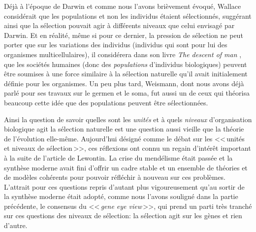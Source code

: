Déjà à l'époque de Darwin et comme nous l'avons brièvement évoqué, Wallace considérait que les populations et non les individus étaient sélectionnés, suggérant ainsi que la sélection pouvait agir à différents niveaux que celui envisagé par Darwin. Et en réalité, même si pour ce dernier, la pression de sélection ne peut porter que sur les variations des individus (individus qui sont pour lui des organismes multicellulaires), il considérera dans son livre \emph{The descent of man} \citep{darwin1871thedescentofman}, que les sociétés humaines (donc des \emph{populations} d'individus biologiques) peuvent être soumises à une force similaire à la sélection naturelle qu'il avait initialement définie pour les organismes. Un peu plus tard, Weismann, dont nous avons déjà parlé pour ses travaux sur le germen et le soma, fut aussi un de ceux qui théorisa beaucoup cette idée que des populations peuvent être sélectionnées.

Ainsi la question de savoir quelles sont les \emph{unités} et à quels \emph{niveaux} d'organisation biologique agit la sélection naturelle est une question aussi vieille que la théorie de l'évolution elle-même. Aujourd'hui désigné comme le débat sur les <<\,unités et niveaux de sélection\,>>, ces réflexions ont connu un regain d'intérêt important à la suite de l'article de Lewontin. La crise du mendélisme était passée et la synthèse moderne avait fini d'offrir un cadre stable et un ensemble de théories et de modèles cohérents pour pouvoir réfléchir à nouveau sur ces problèmes. L'attrait pour ces questions repris d'autant plus vigoureusement qu'au sortir de la synthèse moderne était adopté, comme nous l'avons souligné dans la partie précédente, le consensus du <<\,\emph{gene eye view}\,>>, qui prend un parti très tranché sur ces questions des niveaux de sélection: la sélection agit sur les gènes et rien d'autre. 

